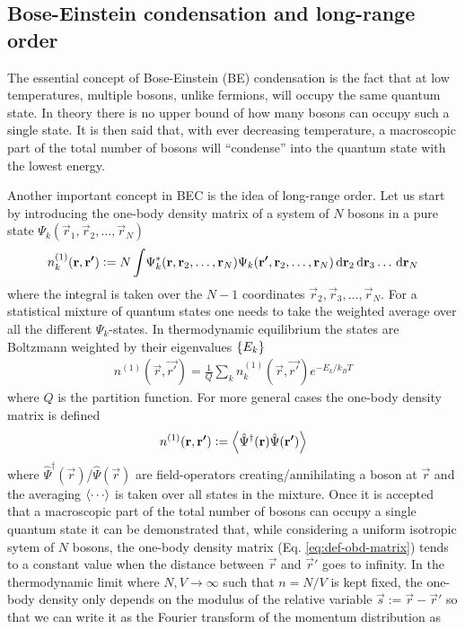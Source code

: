 		\subsection{Bose-Einstein condensation and long-range order}
			The essential concept of Bose-Einstein (BE) condensation is the fact that at low temperatures, multiple bosons, unlike fermions, will occupy the same quantum state. In theory there is no upper bound of how many bosons can occupy such a single state. It is then said that, with ever decreasing temperature, a macroscopic part of the total number of bosons will ``condense'' into the quantum state with the lowest energy.		
			
			Another important concept in BEC is the idea of long-range order. Let us start by introducing the one-body density matrix of a system of $N$ bosons in a pure state $\Psi_k(\vec{r}_1,\vec{r}_2,\ldots,\vec{r}_N)$
			\begin{align}
				n^{(1)}_k(\bm{\mathrm{r}},\bm{\mathrm{r'}}) \vcentcolon= N\int\!	\Psi_k^*(\bm{\mathrm{r}},\bm{\mathrm{r}}_2,\ldots,\bm{\mathrm{r}}_N)\Psi_k(\bm{\mathrm{r'}},\bm{\mathrm{r}}_2,\ldots,\bm{\mathrm{r}}_N)\,\mathrm{d}{\bm{\mathrm{r}}}_2\,\mathrm{d}{\bm{\mathrm{r}}}_3\ldots\,\mathrm{d}{\bm{\mathrm{r}}}_N	\label{eq:def-obd-matrix}
			\end{align}
			where the integral is taken over the $N-1$ coordinates $\vec{r}_2,\vec{r}_3,\ldots,\vec{r}_N$. For a statistical mixture of quantum states one needs to take the weighted average over all the different $\Psi_k$-states. In thermodynamic equilibrium the states are Boltzmann weighted by their eigenvalues $\qty{E_k}$
			\begin{align}
				n^{(1)}(\vec{r},\vec{r'}) = \frac{1}{Q}\sum_k n^{(1)}_k(\vec{r},\vec{r'}) \unit{e}^{-E_k/k_BT}
			\end{align}
			where $Q$ is the partition function. For more general cases the one-body density matrix is defined
			\begin{align}
				n^{(1)}(\bm{\mathrm{r}},\bm{\mathrm{r'}}) \vcentcolon=\expval{\hat\Psi^\dagger(\bm{\mathrm{r}})\hat\Psi(\bm{\mathrm{r'}})}
			\end{align}
			where $\hat\Psi^\dagger(\vec{r})$/$\hat\Psi(\vec{r})$ are field-operators creating/annihilating a boson at $\vec{r}$ and the averaging $\expval{\cdots}$ is taken over all states in the mixture. Once it is accepted that a macroscopic part of the total number of bosons can occupy a single quantum state it can be demonstrated that, while considering a uniform isotropic sytem of $N$ bosons, the one-body density matrix (Eq. \ref{eq:def-obd-matrix}) tends to a constant value when the distance between $\vec{r}$ and $\vec{r}'$ goes to infinity. In the thermodynamic limit where $N,V\rightarrow\infty$ such that $n=N/V$ is kept fixed, the one-body density only depends on the modulus of the relative variable $\vec{s}:=\vec{r}-\vec{r}'$ so that we can write it as the Fourier transform of the momentum distribution as
